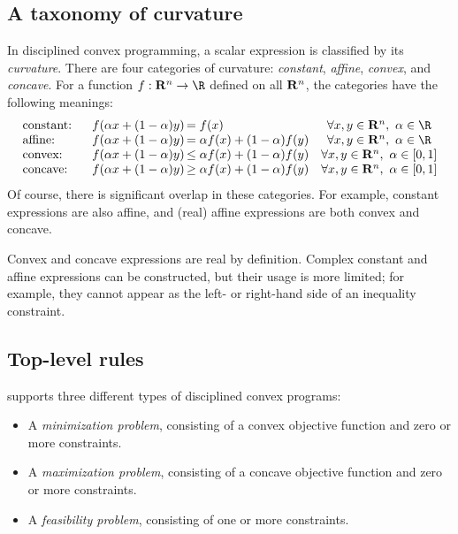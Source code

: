 \documentclass[12pt]{article}
\begin{document}
\subsection{A taxonomy of curvature}
\label{sec:taxonomy}

In disciplined convex programming, a scalar expression is classified
by its \emph{curvature}. There are four
categories of curvature:
\emph{constant}, \emph{affine}, \emph{convex}, and \emph{concave}.
For a function $f:\Rn\rightarrow\R$ defined on all $\mathbf{R}^{n}$,
the categories have the following meanings:
\begin{equation*}
\begin{array}{lc@{\,}lc}
\text{constant:}    & f(\alpha x + (1-\alpha)y) & = f(x) &
 \forall x,y\in\Rn,~\alpha\in\R\\
\text{affine:}      & f(\alpha x + (1-\alpha)y) & =
 \alpha f(x) + (1-\alpha) f(y) & \forall x,y\in\Rn,~\alpha\in\R \\
\text{convex:}  & f(\alpha x + (1-\alpha)y)
 & \leq \alpha f(x) + (1-\alpha) f(y) & \forall x,y\in\Rn,~\alpha\in [0,1] \\
\text{concave:}     \quad & f(\alpha x + (1-\alpha)y) & 
\geq \alpha f(x) + (1-\alpha) f(y) &
\forall x,y\in\Rn,~\alpha\in [0,1] 
\end{array}
\end{equation*}
Of course, there is significant
overlap in these categories. 
For example, constant expressions are also affine,
and (real) affine expressions are both convex and concave.

Convex and concave expressions are real by definition. Complex constant
and affine expressions can be constructed, but their usage is more limited;
for example, they cannot appear as the left- or right-hand side of an inequality
constraint.

\subsection{Top-level rules}
\label{sec:toplevel}

\cvx supports three different types of disciplined convex programs:
\begin{itemize}
\item A \emph{minimization problem}, consisting of a convex objective function
and zero or more constraints.
\item A \emph{maximization problem}, consisting of a concave objective function
and zero or more constraints.
\item A \emph{feasibility problem}, consisting of one or more constraints.
\end{itemize}
\end{document}
